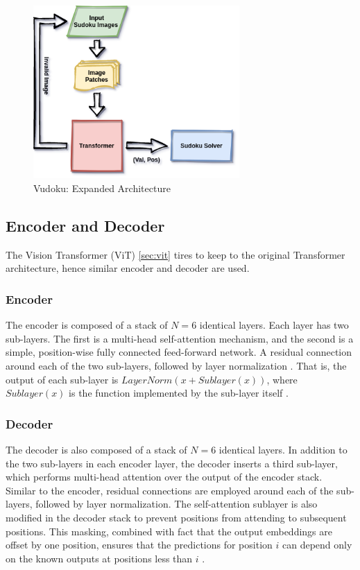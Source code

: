 \documentclass[12pt, a4paper]{report}
\begin{document}
\begin{figure}[!htbp]
    \centering
    \includegraphics[width=0.7\textwidth]{vudoku_arch02.png}
    \caption[Vudoku: Expanded Architecture]{Vudoku: Expanded Architecture}
    \label{fig:6.2}
\end{figure}

\subsection{Encoder and Decoder}
\label{subsec:encdec}

\hspace{0.5cm} The Vision Transformer (ViT) \eqref{sec:vit} tires to keep to the original Transformer architecture, hence similar encoder and decoder are used.

\subsubsection{Encoder}
The encoder is composed of a stack of $N = 6$ identical layers. Each layer has two sub-layers. The first is a multi-head self-attention mechanism, and the second is a simple, position-wise fully connected feed-forward network. A residual connection \cite{2016arXiv160202410J} around each of the two sub-layers, followed by layer normalization \cite{2016arXiv160706450L}. That is, the output of each sub-layer is $LayerNorm(x + Sublayer(x))$, where $Sublayer(x)$ is the function implemented by the sub-layer itself \cite{2017arXiv170603762V}.

\subsubsection{Decoder}
The decoder is also composed of a stack of $N = 6$ identical layers. In addition to the two sub-layers in each encoder layer, the decoder inserts a third sub-layer, which performs multi-head attention over the output of the encoder stack. Similar to the encoder, residual connections are employed around each of the sub-layers, followed by layer normalization. The self-attention sublayer is also modified in the decoder stack to prevent positions from attending to subsequent positions. This masking, combined with fact that the output embeddings are offset by one position, ensures that the predictions for position $i$ can depend only on the known outputs at positions less than $i$ \cite{2017arXiv170603762V}.
\end{document}
